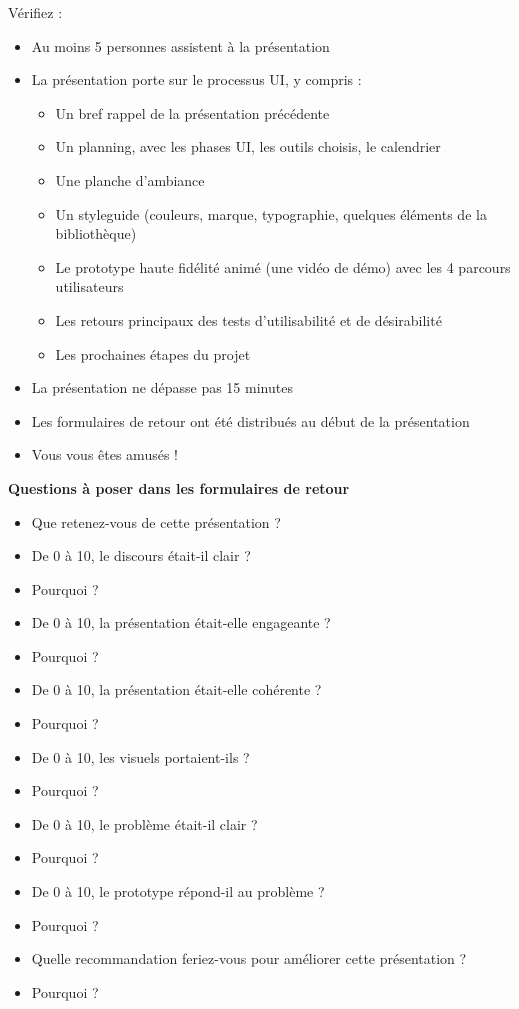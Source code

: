 Vérifiez :

\begin{itemize}
\item Au moins 5 personnes assistent à la présentation
\item La présentation porte sur le processus UI, y compris :
\begin{itemize}
\item Un bref rappel de la présentation précédente
\item Un planning, avec les phases UI, les outils choisis, le calendrier
\item Une planche d'ambiance
\item Un styleguide (couleurs, marque, typographie, quelques éléments de la bibliothèque)
\item Le prototype haute fidélité animé (une vidéo de démo) avec les 4 parcours utilisateurs
\item Les retours principaux des tests d'utilisabilité et de désirabilité
\item Les prochaines étapes du projet
\end{itemize}
\item La présentation ne dépasse pas 15 minutes
\item Les formulaires de retour ont été distribués au début de la présentation
\item Vous vous êtes amusés !
\end{itemize}

\textbf{Questions à poser dans les formulaires de retour}

\begin{itemize}
\item Que retenez-vous de cette présentation ?
\item De 0 à 10, le discours était-il clair ?
\item Pourquoi ?
\item De 0 à 10, la présentation était-elle engageante ?
\item Pourquoi ?
\item De 0 à 10, la présentation était-elle cohérente ?
\item Pourquoi ?
\item De 0 à 10, les visuels portaient-ils ?
\item Pourquoi ?
\item De 0 à 10, le problème était-il clair ?
\item Pourquoi ?
\item De 0 à 10, le prototype répond-il au problème ?
\item Pourquoi ?
\item Quelle recommandation feriez-vous pour améliorer cette présentation ?
\item Pourquoi ?
\end{itemize}


